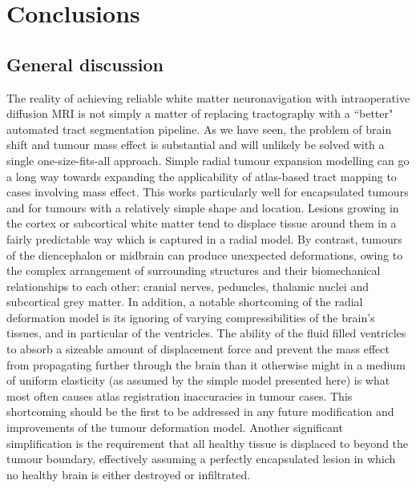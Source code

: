\chapter{Conclusions}
\label{chapterlabel6}


\section{General discussion}


The reality of achieving reliable white matter neuronavigation with intraoperative diffusion MRI is not simply a matter of replacing tractography with a ``better" automated tract segmentation pipeline.
As we have seen, the problem of brain shift and tumour mass effect is substantial and will unlikely be solved with a single one-size-fits-all approach.
Simple radial tumour expansion modelling can go a long way towards expanding the applicability of atlas-based tract mapping to cases involving mass effect.
This works particularly well for encapsulated tumours and for tumours with a relatively simple shape and location.
Lesions growing in the cortex or subcortical white matter tend to displace tissue around them in a fairly predictable way which is captured in a radial model.
By contrast, tumours of the diencephalon or midbrain can produce unexpected deformations, owing to the complex arrangement of surrounding structures and their biomechanical relationships to each other: cranial nerves, peduncles, thalamic nuclei and subcortical grey matter. 
In addition, a notable shortcoming of the radial deformation model is its ignoring of varying compressibilities of the brain's tissues, and in particular of the ventricles.
The ability of the fluid filled ventricles to absorb a sizeable amount of displacement force and prevent the mass effect from propagating further through the brain than it otherwise might in a medium of uniform elasticity (as assumed by the simple model presented here) is what most often  causes atlas registration inaccuracies in tumour cases.
This shortcoming should be the first to be addressed in any future modification and improvements of the tumour deformation model.
Another significant simplification is the requirement  that all healthy tissue is displaced to beyond the tumour boundary, effectively assuming a perfectly encapsulated lesion in which no healthy brain is either destroyed or infiltrated.
